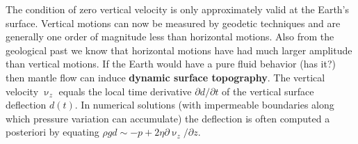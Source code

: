 \vspace{0.5cm}
\vspace{0.5cm}

The condition of zero vertical velocity is only approximately valid at the Earth’s surface.
Vertical motions can now be measured by geodetic techniques and are generally one
order of magnitude less than horizontal motions. Also from the geological past we know
that horizontal motions have had much larger amplitude than vertical motions. If the
Earth would have a pure fluid behavior (has it?) then mantle flow can induce {\bf dynamic
surface topography}. The vertical velocity $\upnu_z$ equals the local time derivative
$\partial d/\partial t$ of the vertical surface deflection $d(t)$. 
In numerical solutions (with impermeable boundaries
along which pressure variation can accumulate) the deflection is often computed a
posteriori by equating $\rho g d \sim -p + 2\eta \partial \upnu_z/\partial z$.

